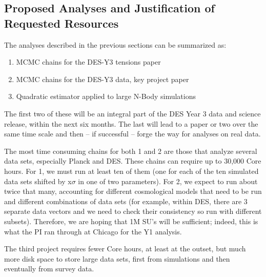 \documentclass[12pt]{article}
\begin{document}
\begin{small}
\section{Proposed Analyses and Justification of Requested Resources}

The analyses described in the previous sections can be summarized as:
\begin{enumerate}
\item MCMC chains for the DES-Y3 tensions paper
\item MCMC chains for the DES-Y3 data, key project paper
\item Quadratic estimator applied to large N-Body simulations
\end{enumerate}
The first two of these will be an integral part of the DES Year 3 data and science release, within the next six months. The last will lead to a paper or two over the same time scale and then -- if successful -- forge the way for analyses on real data.

The most time consuming chains for both 1 and 2 are those that analyze several data sets, especially Planck and DES. These chains can require up to 30,000 Core hours. For 1, we must run at least ten of them (one for each of the ten simulated data sets shifted by x$\sigma$ in one of two parameters). For 2, we expect to run about twice that many, accounting for different cosmological models that need to be run and different combinations of data sets (for example, within DES, there are 3 separate data vectors and we need to check their consistency so run with different subsets). Therefore, we are hoping that 1M SU's will be sufficient; indeed, this is what the PI ran through at Chicago for the Y1 analysis.

The third project requires fewer Core hours, at least at the outset, but much more disk space to store large data sets, first from simulations and then eventually from survey data. 


\end{small}
\end{document}
